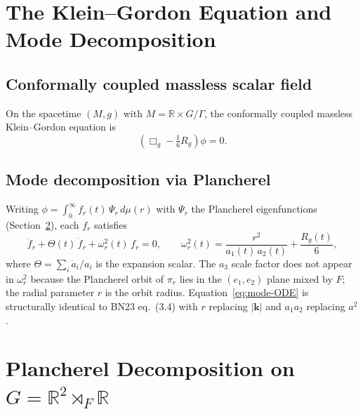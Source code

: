 \documentclass[12pt, a4paper]{article}
\theoremstyle{remark}
\newcommand{\bR}{\mathbb{R}}
\newcommand{\semidp}{\rtimes}
\begin{document}
\section{The Klein--Gordon Equation and Mode Decomposition}\label{sec:KG}

\subsection{Conformally coupled massless scalar field}

On the spacetime $(M, g)$ with $M = \bR \times G/\Gamma$, the conformally
coupled massless Klein--Gordon equation is
\begin{equation}\label{eq:KG}
  \left(\Box_g - \tfrac{1}{6}R_g\right)\phi = 0.
\end{equation}

\subsection{Mode decomposition via Plancherel}

Writing $\phi = \int_0^\infty f_r(t)\,\Psi_r\,d\mu(r)$ with $\Psi_r$ the
Plancherel eigenfunctions (Section~\ref{sec:Plancherel}), each $f_r$
satisfies
\begin{equation}\label{eq:mode-ODE}
  \ddot{f}_r + \Theta(t)\,\dot{f}_r
  + \omega_r^2(t)\,f_r = 0,
  \qquad
  \omega_r^2(t) = \frac{r^2}{a_1(t)\,a_2(t)} + \frac{R_g(t)}{6},
\end{equation}
where $\Theta = \sum_i \dot{a}_i / a_i$ is the expansion scalar.
The $a_3$ scale factor does not appear in $\omega_r^2$ because the
Plancherel orbit of $\pi_r$ lies in the $(e_1, e_2)$ plane mixed by $F$;
the radial parameter $r$ is the orbit radius.
Equation~\eqref{eq:mode-ODE} is structurally identical to BN23 eq.~(3.4)
with $r$ replacing $|\mathbf{k}|$ and $a_1 a_2$ replacing $a^2$.

\section{Plancherel Decomposition on $G = \bR^2 \semidp_F \bR$}\label{sec:Plancherel}
\end{document}
